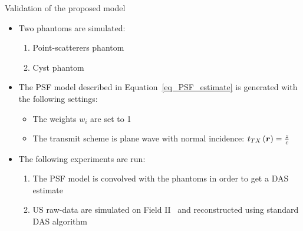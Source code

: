 {\begin{block}{Validation of the proposed model}
	\begin{itemize}
		\item Two phantoms are simulated: 
		\begin{enumerate}
			\item Point-scatterers phantom
			\item Cyst phantom
		\end{enumerate}
		\item The PSF model described in Equation~\eqref{eq_PSF_estimate} is generated with the following settings:
		\begin{itemize}
			\item The weights $w_i$ are set to 1
			\item The transmit scheme is plane wave with normal incidence: $t_{TX} \left(\bm{r}\right) = \frac{z}{c}$
		\end{itemize}
		\item The following experiments are run:
		\begin{enumerate}
			\item The PSF model is convolved with the phantoms in order to get a DAS estimate
			\item US raw-data are simulated on Field II~\cite{jensen1992} and reconstructed using standard DAS algorithm
		\end{enumerate}
	\end{itemize}
	\newlength{\CIRSFigWidth} \setlength{\CIRSFigWidth}{0.48\textwidth}
	\newlength{\CIRSFigHeight}

\end{block}}
